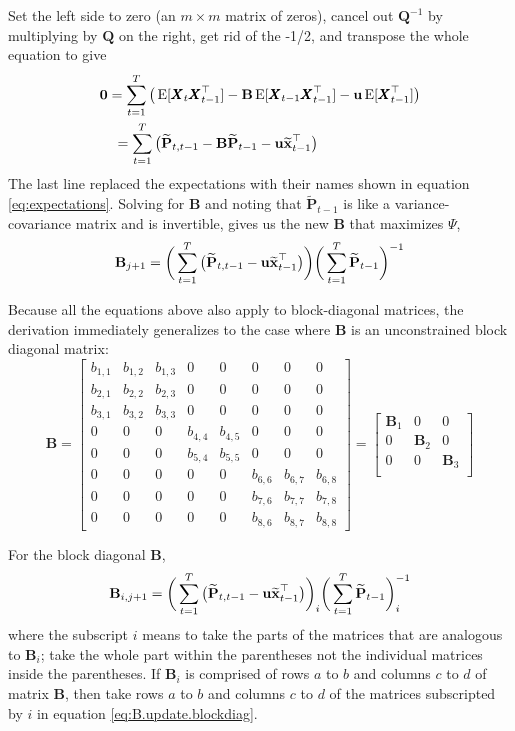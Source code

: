 \documentclass[]{article}
\def\UPS{\mbox{\boldmath $\Upsilon$}}
\def\BB{\mbox{$\mathbf B$}}	\def\bb{\mbox{$\mathbf b$}} \def\Bb{\mbox{$\mathbf J$}} \def\Ba{\mbox{$\mathbf L$}} \def\Bm{\UPS}
\def\E{\,\textup{\textrm{E}}}
\def\PP{\mbox{$\mathbf P$}}  \def\pp{\mbox{$\mathbf p$}}
\def\QQ{\mbox{$\mathbf Q$}}	 \def\qq{\mbox{$\mathbf q$}} \def\Qb{\mbox{$\mathbf G$}}  \def\Qm{\mathbb{Q}}
\def\XX{\mbox{$\pmb{X}$}}	\def\xx{\mbox{$\pmb{x}$}}
\def\hatxtm{\widetilde{\mbox{$\mathbf x$}}_{t-1}}
\def\hatPtm{\widetilde{\PP}_{t-1}}
\def\hatPttm{\widetilde{\PP}_{t,t-1}}
\begin{document}
Set the left side to zero (an $m \times m$ matrix of zeros), cancel out $\QQ^{-1}$ by multiplying by $\QQ$ on the right, get rid of the -1/2, and transpose the whole equation to give
\begin{equation}\label{eq:B.unconstrained4}
\begin{split}
&\mathbf{0}  =  \sum_{t=1}^T\big(\E[\XX_t\XX_{t-1}^\top] - \BB \E[\XX_{t-1}\XX_{t-1}^\top] - \uu \E[\XX_{t-1}^\top]\big)\\ 
&\quad =  \sum_{t=1}^T \big( \hatPttm  - \BB \hatPtm - \uu \hatxtm^\top \big)
\end{split}
\end{equation}
The last line replaced the expectations  with their names shown in  equation \ref{eq:expectations}.
Solving for $\BB$ and noting that $\hatPtm$ is like a variance-covariance matrix and is invertible, gives us the new $\BB$ that maximizes $\Psi$, 
\begin{equation}\label{eq:B.update.unconstrained}
\BB_{j+1}= \bigg( \sum_{t=1}^T \big( \hatPttm  - \uu \hatxtm^\top \big)\bigg) \bigg(\sum_{t=1}^T \hatPtm\bigg)^{-1}
\end{equation}

Because all the equations above also apply to block-diagonal matrices, the derivation immediately generalizes to the case where $\BB$ is an unconstrained block diagonal matrix:
\begin{equation*}
\BB =
\begin{bmatrix}
b_{1,1}&b_{1,2}&b_{1,3}&0&0&0&0&0\\
b_{2,1}&b_{2,2}&b_{2,3}&0&0&0&0&0\\
b_{3,1}&b_{3,2}&b_{3,3}&0&0&0&0&0\\
0&0&0&b_{4,4}&b_{4,5}&0&0&0\\
0&0&0&b_{5,4}&b_{5,5}&0&0&0\\
0&0&0&0&0&b_{6,6}&b_{6,7}&b_{6,8}\\
0&0&0&0&0&b_{7,6}&b_{7,7}&b_{7,8}\\
0&0&0&0&0&b_{8,6}&b_{8,7}&b_{8,8}
\end{bmatrix}
=
\begin{bmatrix}
\BB_1&0&0\\
0&\BB_2&0\\
0&0&\BB_3\\
\end{bmatrix}
\end{equation*} 

For the block diagonal $\BB$,
\begin{equation}\label{eq:B.update.blockdiag}
\BB_{i,j+1}= \bigg( \sum_{t=1}^T \big( \hatPttm  - \uu \hatxtm^\top \big) \bigg)_i \bigg(\sum_{t=1}^T \hatPtm \bigg)_i^{-1}
\end{equation}
where the subscript $i$ means to take the parts of the matrices that are analogous to $\BB_i$; take the whole part within the parentheses not the individual matrices inside the parentheses.  If $\BB_i$ is comprised of rows $a$ to $b$ and columns $c$ to $d$ of matrix $\BB$, then  take rows $a$ to $b$ and columns $c$ to $d$ of the matrices subscripted by $i$ in equation \ref{eq:B.update.blockdiag}.
\end{document}

